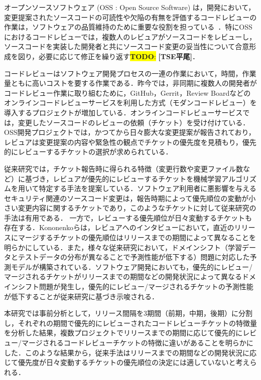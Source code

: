 \documentclass[submit]{ipsj}
\newcommand{\todo}[1]{\colorbox{yellow}{{\bf TODO}:}{\color{red} {\textbf{[#1]}}}}
\begin{document}
オープンソースソフトウェア (OSS : Open Source Software) は，開発において，変更提案されたソースコードの可読性や欠陥の有無を評価するコードレビューの作業は，ソフトウェアの品質維持のために重要な役割を担っている~\cite{quality1}\cite{quality2}．特にOSSにおけるコードレビューでは，複数人のレビュアがソースコードをレビューし，ソースコードを実装した開発者と共にソースコード変更の妥当性について合意形成を図り，必要に応じて修正を繰り返す\todo{TSE平尾}．

コードレビューはソフトウェア開発プロセスの一連の作業において，時間，作業量ともに高いコストを要する作業である\cite{cost}．昨今では，非同期に複数人の開発者がコードレビュー作業に取り組むために，GitHub，Gerrit，Review Boardなどのオンラインコードレビューサービスを利用した方式（モダンコードレビュー\cite{quality1}）を導入するプロジェクトが増加している．オンラインコードレビューサービスでは，変更したソースコードのレビューの依頼（チケット）を受け付けている．
OSS開発プロジェクトでは，かつてから日々膨大な変更提案が報告されており，レビュアは変更提案の内容や緊急性の観点でチケットの優先度を見積もり，優先的にレビューするチケットの選択が求められている\cite{integrator}．

従来研究では，チケット報告時に得られる特徴（変更行数や変更ファイル数など）に基づき，レビュアが優先的にレビューするチケットを機械学習アルゴリズムを用いて特定する手法を提案している\cite{prioritizer}\cite{review_prioritize_pineapple}．ソフトウェア利用者に悪影響を与えるセキュリティ関連のソースコード変更は，報告時期によって優先順位の変動が小さい変更内容に関するチケットであり，このようなチケットに対して従来研究の手法は有用である．
一方で，レビューする優先順位が日々変動するチケットも存在する．Kononenkoらは，レビュアへのインタビューにおいて，直近のリリースにマージするチケットの優先順位はリリースまでの期間によって異なることを明らかにしている\cite{release_merge}．また，様々な従来研究において，ドメインシフト（学習データとテストデータの分布が異なることで予測性能が低下する）問題に対応した予測モデルが構築されている\cite{domain1}\cite{domain2}．ソフトウェア開発においても，優先的にレビュー/マージされるチケットがリリースまでの期間などの開発状況によって異なるドメインシフト問題が発生し，優先的にレビュー/マージされるチケットの予測性能が低下することが従来研究\cite{release_merge}に基づき示唆される．

本研究では事前分析として，リリース間隔を3期間（前期，中期，後期）に分割し，それぞれの期間で優先的にレビューされたコードレビューチケットの特徴量を分析した結果，複数プロジェクトでリリースまでの期間に応じて優先的にレビュー/マージされるコードレビューチケットの特徴に違いがあることを明らかにした．このような結果から，従来手法はリリースまでの期間などの開発状況に応じて優先度が日々変動するチケットの優先順位の決定には適していないと考えられる．
\end{document}
